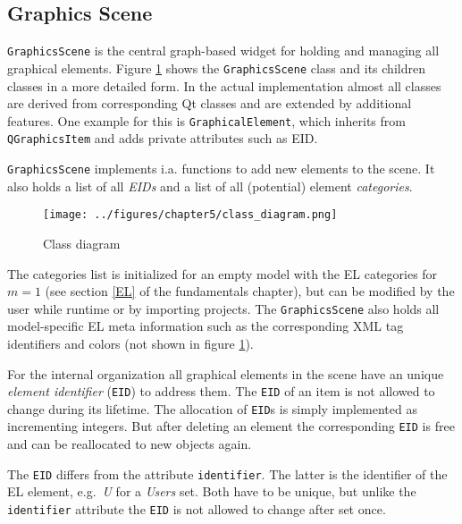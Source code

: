 \documentclass[twoside, openright, 12pt]{book}
\begin{document}
\subsection{Graphics Scene}
\label{implementation_graphicsscene}
\texttt{GraphicsScene} is the central graph-based widget for holding and managing all graphical elements.
Figure \ref{fig:class_diagram} shows the \texttt{GraphicsScene} class and its children classes in a more detailed form.
In the actual implementation almost all classes are derived from corresponding Qt classes and are extended by additional features.
One example for this is \texttt{GraphicalElement}, which inherits from \texttt{QGraphicsItem} and adds private attributes such as EID.

\noindent
\texttt{GraphicsScene} implements i.a. functions to add new elements to the scene.
It also holds a list of all \textit{EIDs} and a list of all (potential) element \textit{categories}.

\begin{figure}[htb]
	\centering
	\texttt{[image: ../figures/chapter5/class\_diagram.png]}
	\caption{Class diagram}
	\label{fig:class_diagram}
\end{figure}

\noindent
The categories list is initialized for an empty model with the EL categories for $m=1$ (see section \ref{EL} of the fundamentals chapter), but can be modified by the user while runtime or by importing projects.
The \texttt{GraphicsScene} also holds all model-specific EL meta information such as the corresponding XML tag identifiers and colors (not shown in figure \ref{fig:class_diagram}).

For the internal organization all graphical elements in the scene have an unique \textit{element identifier} (\texttt{EID}) to address them.
The \texttt{EID} of an item is not allowed to change during its lifetime.
The allocation of \texttt{EID}s is simply implemented as incrementing integers.
But after deleting an element the corresponding \texttt{EID} is free and can be reallocated to new objects again.

\begin{mdframed}[style=mystyle,frametitle=Note]
The \texttt{EID} differs from the attribute \texttt{identifier}.
The latter is the identifier of the EL element, e.g.\ \textit{U} for a \textit{Users} set.
Both have to be unique, but unlike the \texttt{identifier} attribute the \texttt{EID} is not allowed to change after set once.
\end{mdframed}
\end{document}
